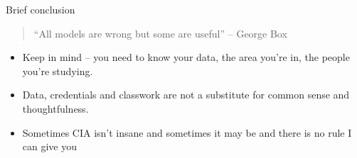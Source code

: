 \documentclass{beamer}
\begin{document}
\begin{frame}{Brief conclusion}

\begin{quote}
 ``All models are wrong but some are useful'' -- George Box
 \end{quote}
 
 \begin{itemize}
 \item Keep in mind -- you need to know your data, the area you're in, the people you're studying. 
 \item Data, credentials and classwork are not a substitute for common sense and thoughtfulness. 
 \item Sometimes CIA isn't insane and sometimes it may be and there is no rule I can give you

\end{itemize}

\end{frame}
\end{document}
